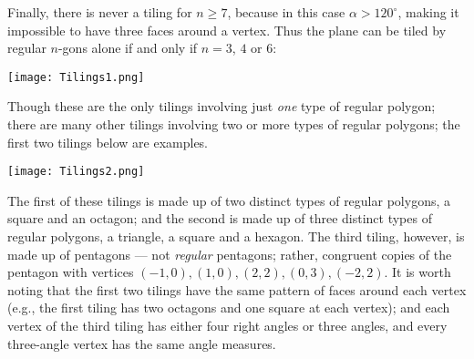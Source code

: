 \documentclass[leqno]{book}
\begin{document}
Finally, there is never a tiling for $n\geqslant 7$, because in this case $\alpha>120^\circ$, making it impossible to have three faces around a vertex.  Thus the plane can be tiled by regular $n$-gons alone if and only if $n=3$, $4$ or $6$:
\begin{center}\texttt{[image: Tilings1.png]}\end{center}
Though these are the only tilings involving just \emph{one} type of regular polygon; there are many other tilings involving two or more types of regular polygons; the first two tilings below are examples.
\begin{center}\texttt{[image: Tilings2.png]}\end{center}
The first of these tilings is made up of two distinct types of regular polygons, a square and an octagon; and the second is made up of three distinct types of regular polygons, a triangle, a square and a hexagon.  The third tiling, however, is made up of pentagons \---- not \emph{regular} pentagons; rather, congruent copies of the pentagon with vertices $(-1,0),(1,0),(2,2),(0,3),(-2,2)$.  It is worth noting that the first two tilings have the same pattern of faces around each vertex (e.g., the first tiling has two octagons and one square at each vertex); and each vertex of the third tiling has either four right angles or three angles, and every three-angle vertex has the same angle measures. %
\end{document}

